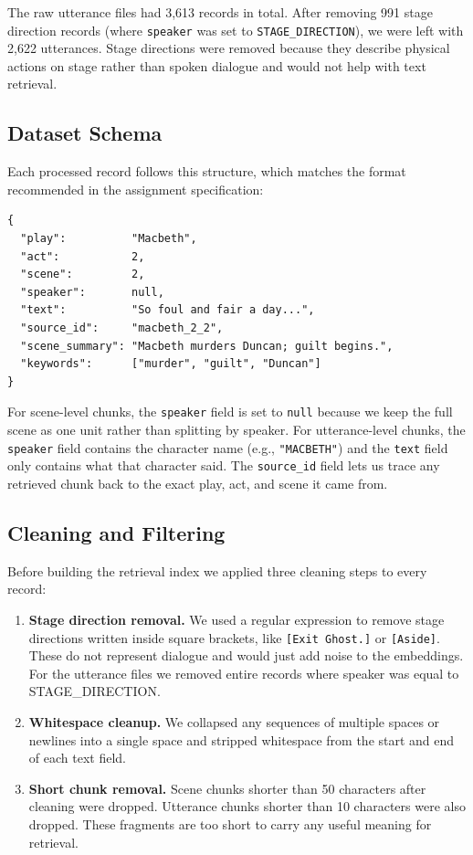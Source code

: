 \documentclass[10pt,conference]{IEEEtran}
\begin{document}
The raw utterance files had 3{,}613 records in total. After removing
991 stage direction records (where \texttt{speaker} was set to
\texttt{STAGE\_DIRECTION}), we were left with 2{,}622 utterances.
Stage directions were removed because they describe physical actions
on stage rather than spoken dialogue and would not help with text
retrieval.

\subsection{Dataset Schema}

Each processed record follows this structure, which matches the
format recommended in the assignment specification:

\begin{lstlisting}
{
  "play":          "Macbeth",
  "act":           2,
  "scene":         2,
  "speaker":       null,
  "text":          "So foul and fair a day...",
  "source_id":     "macbeth_2_2",
  "scene_summary": "Macbeth murders Duncan; guilt begins.",
  "keywords":      ["murder", "guilt", "Duncan"]
}
\end{lstlisting}

For scene-level chunks, the \texttt{speaker} field is set to
\texttt{null} because we keep the full scene as one unit rather than
splitting by speaker. For utterance-level chunks, the
\texttt{speaker} field contains the character name (e.g.,
\texttt{"MACBETH"}) and the \texttt{text} field only contains what
that character said. The \texttt{source\_id} field lets us trace any
retrieved chunk back to the exact play, act, and scene it came from.

\subsection{Cleaning and Filtering}

Before building the retrieval index we applied three cleaning steps
to every record:

\begin{enumerate}
    \item \textbf{Stage direction removal.} We used a regular
    expression to remove stage directions written inside square
    brackets, like \texttt{[Exit Ghost.]} or \texttt{[Aside]}.
    These do not represent dialogue and would just add noise to the
    embeddings. For the utterance files we removed entire records
    where speaker was equal to STAGE\_DIRECTION.

    \item \textbf{Whitespace cleanup.} We collapsed any sequences
    of multiple spaces or newlines into a single space and stripped
    whitespace from the start and end of each text field.

    \item \textbf{Short chunk removal.} Scene chunks shorter than
    50 characters after cleaning were dropped. Utterance chunks
    shorter than 10 characters were also dropped. These fragments
    are too short to carry any useful meaning for retrieval.
\end{enumerate}
\end{document}
